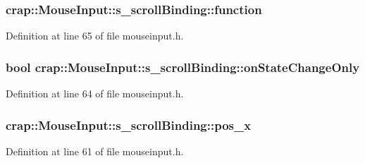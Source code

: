 \subsubsection[{function}]{ crap\+::\+Mouse\+Input\+::s\+\_\+scroll\+Binding\+::function}\label{structcrap_1_1_mouse_input_1_1s__scroll_binding_a0b077149c24a9048837b78aa7bf17353}


Definition at line 65 of file mouseinput.\+h.

\hypertarget{structcrap_1_1_mouse_input_1_1s__scroll_binding_a74d94e372fc88fac3f133fa365b18237}{}
\subsubsection[{on\+State\+Change\+Only}]{\setlength{\rightskip}{0pt plus 5cm}bool crap\+::\+Mouse\+Input\+::s\+\_\+scroll\+Binding\+::on\+State\+Change\+Only}\label{structcrap_1_1_mouse_input_1_1s__scroll_binding_a74d94e372fc88fac3f133fa365b18237}


Definition at line 64 of file mouseinput.\+h.

\hypertarget{structcrap_1_1_mouse_input_1_1s__scroll_binding_a283ce47bf3af302550bd17b7e990f4ba}{}
\subsubsection[{pos\+\_\+x}]{ crap\+::\+Mouse\+Input\+::s\+\_\+scroll\+Binding\+::pos\+\_\+x}\label{structcrap_1_1_mouse_input_1_1s__scroll_binding_a283ce47bf3af302550bd17b7e990f4ba}


Definition at line 61 of file mouseinput.\+h.

\hypertarget{structcrap_1_1_mouse_input_1_1s__scroll_binding_a2ae3a880b3e3eb89552c16f25a0a2a2c}{}
